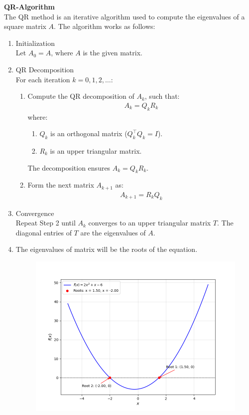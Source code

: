 \documentclass[journal]{IEEEtran}
\numberwithin{equation}{enumi}
\numberwithin{figure}{enumi}
\begin{document}
\textbf{QR-Algorithm}\\
The QR method is an iterative algorithm used to compute the eigenvalues of a square matrix $A$. The algorithm works as follows:
\begin{enumerate}
\item Initialization \\
Let $A_0 = A $, where $A$ is the given matrix.

\item QR Decomposition \\
For each iteration $ k = 0, 1, 2, \dots $:
\begin{enumerate}
    \item Compute the QR decomposition of \( A_k \), such that:
    \begin{align}
    A_k = Q_k R_k
    \end{align}
    where:
    \begin{enumerate}
        \item $Q_k $ is an orthogonal matrix ($ Q_k^\top Q_k = I $).
        \item $ R_k $ is an upper triangular matrix.
    \end{enumerate}
    The decomposition ensures $ A_k = Q_k R_k $.

    \item Form the next matrix \( A_{k+1} \) as:
    \begin{align}
    A_{k+1} = R_k Q_k
    \end{align}
\end{enumerate}

\item Convergence\\
Repeat Step 2 until $ A_k $ converges to an upper triangular matrix $ T $. The diagonal entries of $T$ are the eigenvalues of $A$.\\
\item The eigenvalues of matrix will be the roots of the equation.
\begin{figure}[h!]
	\centering
	\includegraphics[width=\columnwidth]{figs/Figure_1.png}
	\label{stemplot}
\end{figure}

\end{enumerate}
\end{document}

